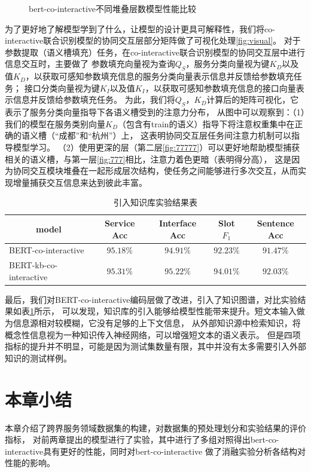 \begin{figure}[htbp]
{  \label{fig:slotF12}
  }
  \caption{bert-co-interactive不同堆叠层数模型性能比较}
  \label{fig:layerCompare}
  \end{figure}

  为了更好地了解模型学到了什么，让模型的设计更具可解释性，我们将co-interactive联合识别模型的协同交互层部分矩阵做了可视化处理\ref{fig:visual}。
  对于参数提取（语义槽填充）任务，在co-interactive联合识别模型的协同交互层中进行信息交互时，主要做了
  参数填充向量视为查询$Q_S$，服务分类向量视为键$K_D$以及值$K_D$，以获取可感知参数填充信息的服务分类向量表示信息并反馈给参数填充任务；
接口分类向量视为键$K_I$以及值$K_I$，以获取可感知参数填充信息的接口向量表示信息并反馈给参数填充任务。
  为此，我们将$Q_S$，$K_D$计算后的矩阵可视化，它表示了服务分类向量指导下各语义槽受到的注意力分布，
  从图中可以观察到：（1）我们的模型在服务类别向量$K_D$（包含有train的语义）指导下将注意权重集中在正确的语义槽（“成都”和“杭州”）上，
  这表明协同交互层任务间注意力机制可以指导模型学习。
  （2）使用更深的层（第二层\ref{fig:77777}）可以更好地帮助模型捕获相关的语义槽，与第一层\ref{fig:777}相比，注意力着色更暗（表明得分高），
  这是因为协同交互模块堆叠在一起形成层次结构，使任务之间能够进行多次交互，从而实现增量捕获交互信息来达到彼此丰富。

  \begin{table}[htb]
    \centering
    \caption{引入知识库实验结果表}
    \label{tab:kbjieguo}
\begin{tabular}{l|cccc}
  \toprule
  \multicolumn{1}{c|}{\centering model}&Service Acc&Interface Acc&Slot $F_1$&Sentence Acc\\
   \hline
   BERT-co-interactive&$95.18\%$&$94.91\%$&$92.23\%$&$91.47\%$\\
   BERT-kb-co-interactive&$\mathbf{95.31\%}$&$\mathbf{95.22}\%$&$\mathbf{94.01}\%$&$\mathbf{92.03}\%$\\
  \bottomrule
  \end{tabular}
\end{table}
最后，我们对BERT-co-interactive编码层做了改进，引入了知识图谱，对比实验结果如表\ref{tab:kbjieguo}所示，
可以发现，知识库的引入能够给模型性能带来提升。短文本输入做为信息源相对较模糊，它没有足够的上下文信息，
从外部知识源中检索知识，将概念性信息视为一种知识传入神经网络，可以增强短文本的语义表示。
但是四项指标的提升并不明显，可能是因为测试集数量有限，其中并没有太多需要引入外部知识的测试样例。

  \section{本章小结}
  本章介绍了跨界服务领域数据集的构建，对数据集的预处理划分和实验结果的评价指标，
对前两章提出的模型进行了实验，其中进行了多组对照得出bert-co-interactive具有更好的性能，同时对bert-co-interactive
做了消融实验分析各结构对性能的影响。